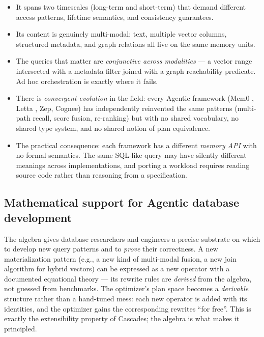 \documentclass[sigconf,nonacm,review]{acmart}
\theoremstyle{plain}
\theoremstyle{definition}
\theoremstyle{remark}
\begin{document}
\begin{itemize}[leftmargin=*]
  \item It spans two timescales (long-term and short-term) that demand
    different access patterns, lifetime semantics, and consistency
    guarantees.
  \item Its content is genuinely multi-modal: text, multiple vector
    columns, structured metadata, and graph relations all live on the
    same memory units.
  \item The queries that matter are \emph{conjunctive across
    modalities} --- a vector range intersected with a metadata filter
    joined with a graph reachability predicate. Ad hoc orchestration
    is exactly where it fails.
  \item There is \emph{convergent evolution} in the field: every
    Agentic framework (Mem0 \cite{mem0}, Letta \cite{letta}, Zep, Cognee)
    has independently
    reinvented the same patterns (multi-path recall, score fusion,
    re-ranking) but with no shared vocabulary, no shared type
    system, and no shared notion of plan equivalence.
  \item The practical consequence: each framework has a different
    \emph{memory API} with no formal semantics. The same SQL-like
    query may have silently different meanings across
    implementations, and porting a workload requires reading source
    code rather than reasoning from a specification.
\end{itemize}

\subsection{Mathematical support for Agentic database development}\label{sec:intro:support}

The algebra gives database researchers and engineers a precise
substrate on which to develop new query patterns and to \emph{prove}
their correctness. A new materialization pattern (e.g., a new kind of
multi-modal fusion, a new join algorithm for hybrid vectors) can be
expressed as a new operator with a documented equational theory ---
its rewrite rules are \emph{derived} from the algebra, not guessed
from benchmarks. The optimizer's plan space becomes a
\emph{derivable} structure rather than a hand-tuned mess: each new
operator is added with its identities, and the optimizer gains the
corresponding rewrites ``for free''. This is exactly the
extensibility property of Cascades; the algebra is what makes it
principled.
\end{document}
